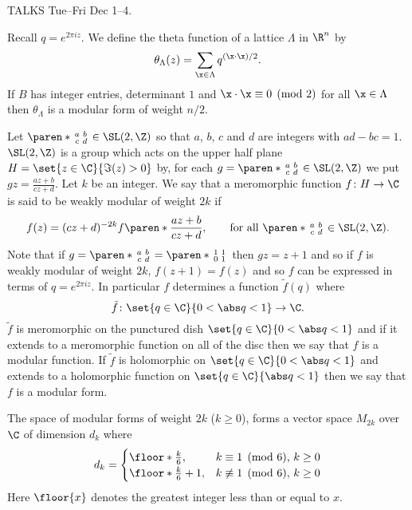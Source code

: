 TALKS Tue--Fri Dec 1--4.

Recall $q=e^{2\pi iz}$.  We define the theta function of a lattice $\Lambda$ in $\R^n$ by
\[ \theta_\Lambda(z) = \sum_{\x\in\Lambda} q^{(\x\cdot\x)/2} . \]
If $B$ has integer entries, determinant $1$ and $\x\cdot\x\equiv0\pmod2$ for all $\x\in\Lambda$ then $\theta_\Lambda$ is a modular form of weight $n/2$.

Let $\paren*{\begin{smallmatrix}a&b\\c&d\end{smallmatrix}}\in\SL(2,\Z)$ so that $a$, $b$, $c$ and $d$ are integers with $ad-bc=1$.  $\SL(2,\Z)$ is a group which acts on the upper half plane $H=\set{z\in\C}{\Im(z)>0}$ by, for each $g=\paren*{\begin{smallmatrix}a&b\\c&d\end{smallmatrix}}\in\SL(2,\Z)$ we put $gz=\frac{az+b}{cz+d}$.  Let $k$ be an integer.  We say that a meromorphic function $f\colon H\to\C$ is said to be weakly modular of weight $2k$ if
\[ f(z) = (cz+d)^{-2k}f\paren*{\frac{az+b}{cz+d}}, \qquad \text{for all $\paren*{\begin{smallmatrix}a&b\\c&d\end{smallmatrix}}\in\SL(2,\Z)$} . \]
Note that if $g=\paren*{\begin{smallmatrix}a&b\\c&d\end{smallmatrix}}=\paren*{\begin{smallmatrix}1&1\\0&1\end{smallmatrix}}$ then $gz=z+1$ and so if $f$ is weakly modular of weight $2k$, $f(z+1)=f(z)$ and so $f$ can be expressed in terms of $q=e^{2\pi iz}$.  In particular $f$ determines a function $\tilde f(q)$ where
\[ \tilde f\colon \set{q\in\C}{0<\abs q<1} \to \C . \]
$\tilde f$ is meromorphic on the punctured dish $\set{q\in\C}{0<\abs q<1}$ and if it extends to a meromorphic function on all of the disc then we say that $f$ is a modular function.  If $\tilde f$ is holomorphic on $\set{q\in\C}{0<\abs q<1}$ and extends to a holomorphic function on $\set{q\in\C}{\abs q<1}$ then we say that $f$ is a modular form.

The space of modular forms of weight $2k$ ($k\geq0$), forms a vector space $M_{2k}$ over $\C$ of dimension $d_k$ where
\[ d_k = \begin{cases}
\floor*{\frac{k}{6}}, & k\equiv1\pmod6\text{, }k\geq0 \\
\floor*{\frac{k}{6}}+1, & k\not\equiv1\pmod6\text{, }k\geq0
\end{cases} \]
Here $\floor{x}$ denotes the greatest integer less than or equal to $x$.

